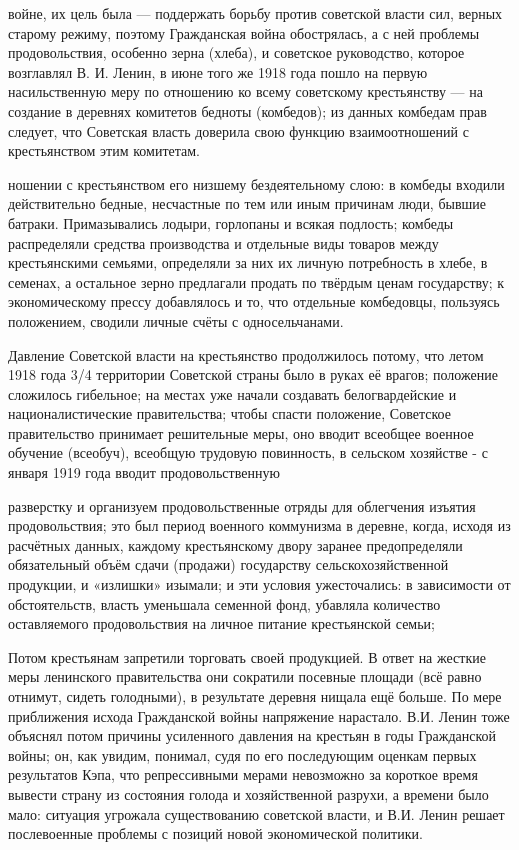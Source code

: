 \label{083-1}
войне, их цель была — поддержать борьбу против советской власти сил, верных старому режиму, поэтому Гражданская война обострялась, а с ней проблемы продовольствия, особенно зерна (хлеба), и советское руководство, которое возглавлял В. И. Ленин, в июне того же 1918 года пошло на первую насильственную меру по отношению ко всему советскому крестьянству — на создание в деревнях комитетов бедноты (комбедов); из данных комбедам прав следует, что Советская власть доверила свою функцию взаимоотношений с крестьянством этим комитетам.

\label{084-1}
ношении с крестьянством его низшему бездеятельному слою: в комбеды входили действительно бедные, несчастные по тем или иным причинам люди, бывшие батраки. Примазывались лодыри, горлопаны и всякая подлость; комбеды распределяли средства производства и отдельные виды товаров между крестьянскими семьями, определяли за них их личную потребность в хлебе, в семенах, а остальное зерно предлагали продать по твёрдым ценам государству; к экономическому прессу добавлялось и то, что отдельные комбедовцы, пользуясь положением, сводили личные счёты с односельчанами.

\label{085-1}
Давление Советской власти на крестьянство продолжилось потому, что летом 1918 года 3/4 территории Советской страны было в руках её врагов; положение сложилось гибельное; на местах уже начали создавать белогвардейские и националистические правительства; чтобы спасти положение, Советское правительство принимает решительные меры, оно вводит всеобщее военное обучение (всеобуч), всеобщую трудовую повинность, в сельском хозяйстве - с января 1919 года вводит продовольственную

\label{086-1}
разверстку и организуем продовольственные отряды для облегчения изъятия продовольствия; это был период военного коммунизма в деревне, когда, исходя из расчётных данных, каждому крестьянскому двору заранее предопределяли обязательный объём сдачи (продажи) государству сельскохозяйственной продукции, и «излишки» изымали; и эти условия ужесточались: в зависимости от обстоятельств, власть уменьшала семенной фонд, убавляла количество оставляемого продовольствия на личное питание крестьянской семьи;

\label{087-1}
Потом крестьянам запретили торговать своей продукцией. В ответ на жесткие меры ленинского правительства они сократили посевные площади (всё равно отнимут, сидеть голодными), в результате деревня нищала ещё больше. По мере приближения исхода Гражданской войны напряжение нарастало. В.И. Ленин тоже объяснял потом причины усиленного давления на крестьян в годы Гражданской войны; он, как увидим, понимал, судя по его последующим оценкам первых результатов Кэпа, что репрессивными мерами невозможно за короткое время вывести страну из состояния голода и хозяйственной разрухи, а времени было мало: ситуация угрожала существованию советской власти, и В.И. Ленин решает послевоенные проблемы с позиций новой экономической политики.


